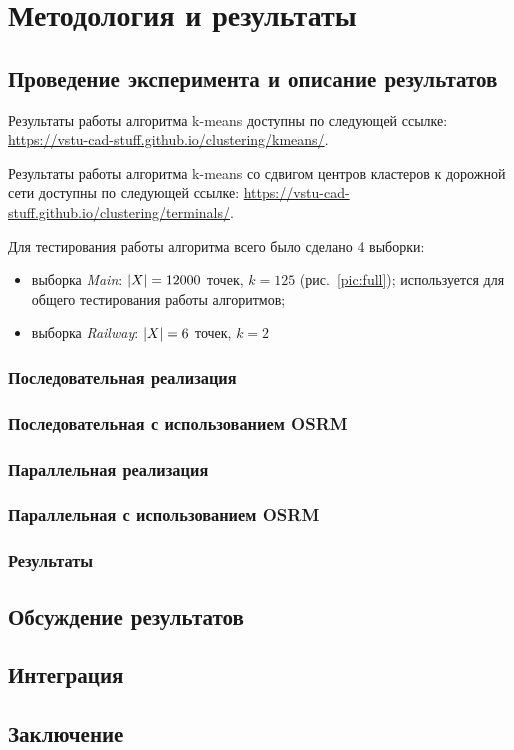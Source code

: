 \chapter{Методология и результаты}
\section{Проведение эксперимента и описание результатов}
Результаты работы алгоритма k-means доступны по следующей ссылке:\linebreak
\url{https://vstu-cad-stuff.github.io/clustering/kmeans/}.

Результаты работы алгоритма k-means со сдвигом центров кластеров к дорожной сети доступны по следующей ссылке:\linebreak
\url{https://vstu-cad-stuff.github.io/clustering/terminals/}.

Для тестирования работы алгоритма всего было сделано 4 выборки:
\begin{itemize}
    \item выборка \emph{Main}: \( \left|X\right| = 12 000 \) точек, \( k = 125 \) (рис.~\ref{pic:full}); используется для общего тестирования работы алгоритмов;
    \item выборка \emph{Railway}: \( \left|X\right| = 6 \) точек, \( k = 2 \)
\end{itemize}

\subsection{Последовательная реализация}
\subsection{Последовательная с использованием OSRM}
\subsection{Параллельная реализация}
\subsection{Параллельная с использованием OSRM}
\subsection{Результаты}
\section{Обсуждение результатов}
\section{Интеграция}
\section{Заключение}

